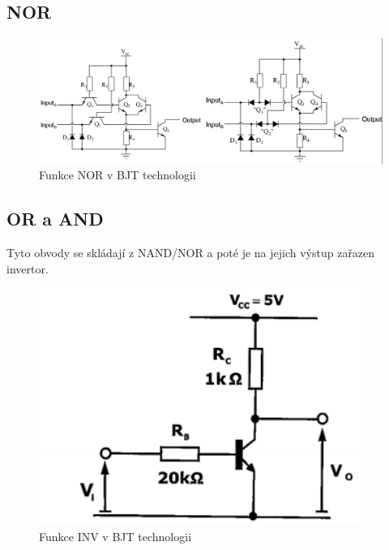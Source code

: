  \subsection{NOR}
   \begin{figure}[h]
   \begin{center}
     \includegraphics[scale=0.6]{images/NORBJT.png}
   \end{center}
   \caption{Funkce NOR v BJT technologii}
  \end{figure}
\pagebreak
\subsection{OR a AND}
Tyto obvody se skládají z NAND/NOR a poté je na jejich výstup zařazen invertor.
   \begin{figure}[h]
   \begin{center}
     \includegraphics[scale=0.6]{images/INVBJT.png}
   \end{center}
   \caption{Funkce INV v BJT technologii}
  \end{figure}

